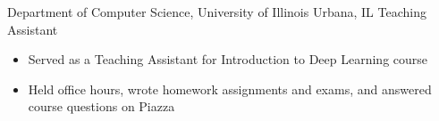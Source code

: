 
        {Department of Computer Science, University of Illinois}
        {Urbana, IL}
        {Teaching Assistant}
        {}{
    \begin{itemize}
        \item Served as a Teaching Assistant for Introduction to Deep Learning course
        \item Held office hours, wrote homework assignments and exams, and answered course questions on Piazza
    \end{itemize}
}
